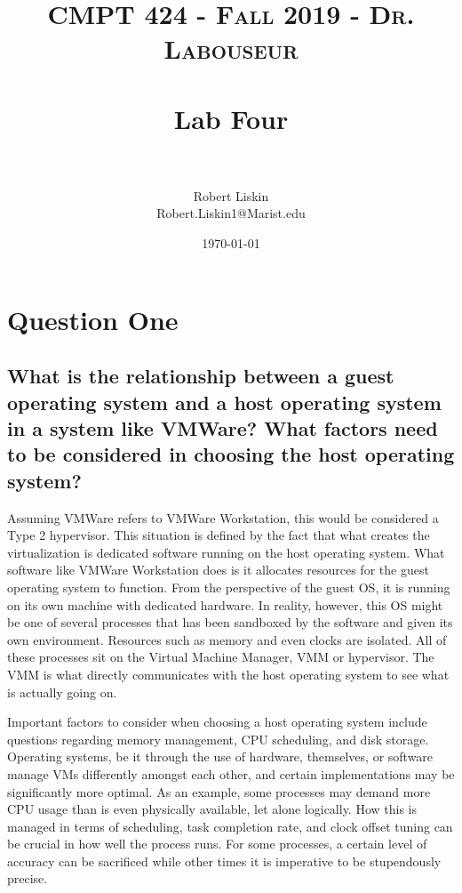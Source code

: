 \documentclass[letterpaper, 10pt,DIV=13]{scrartcl}
\title{	
   \normalfont \normalsize 
   \textsc{CMPT 424 - Fall 2019 - Dr. Labouseur} \\[10pt] %
   \horrule{0.5pt} \\[0.25cm] 	%
   \huge Lab Four  \\     	    %
   \horrule{0.5pt} \\[0.25cm] 	%
}
\author{Robert Liskin \\ \normalsize Robert.Liskin1@Marist.edu}
\date{\normalsize\today} 	%
\numberwithin{equation}{section} %
\numberwithin{figure}{section} %
\numberwithin{table}{section} %
\begin{document}
\maketitle %

\section{Question One}

\subsection{What is the relationship between a guest operating system and a host operating system in a system like VMWare? What factors need to be considered in choosing the host operating system?}
\par
Assuming VMWare refers to VMWare Workstation, this would be considered a Type 2 hypervisor. This situation is defined by the fact that what creates the virtualization is dedicated software running on the host operating system. What software like VMWare Workstation does is it allocates resources for the guest operating system to function. From the perspective of the guest OS, it is running on its own machine with dedicated hardware. In reality, however, this OS might be one of several processes that has been sandboxed by the software and given its own environment. Resources such as memory and even clocks are isolated. All of these processes sit on the Virtual Machine Manager, VMM or hypervisor. The VMM is what directly communicates with the host operating system to see what is actually going on.
\par
Important factors to consider when choosing a host operating system include questions regarding memory management, CPU scheduling, and disk storage. Operating systems, be it through the use of hardware, themselves, or software manage VMs differently amongst each other, and certain implementations may be significantly more optimal. As an example, some processes may demand more CPU usage than is even physically available, let alone logically. How this is managed in terms of scheduling, task completion rate, and clock offset tuning can be crucial in how well the process runs. For some processes, a certain level of accuracy can be sacrificed while other times it is imperative to be stupendously precise.



\pagebreak
\end{document}
